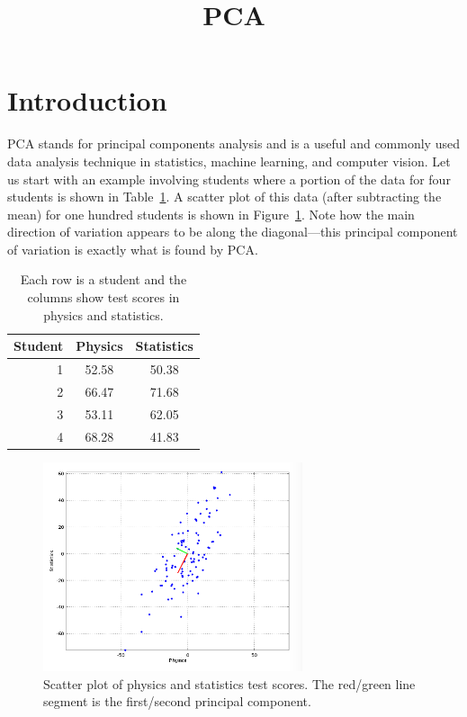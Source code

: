 \documentclass{article}
\begin{document}
\title{PCA}
\author{}
\date{}
\maketitle

\section{Introduction}

PCA stands for principal components analysis and is a useful and commonly used data analysis technique in statistics, machine learning, and computer vision.  Let us start with an example involving students where a portion of the data for four students is shown in Table~\ref{tab:students}.  A scatter plot of this data (after subtracting the mean) for one hundred students is shown in Figure~\ref{fig:students}.  Note how the main direction of variation appears to be along the diagonal---this principal component of variation is exactly what is found by PCA.

\begin{table}
\centering
\begin{tabular}{rcc}
Student & Physics & Statistics \\
\hline
1 & 52.58 & 50.38 \\
2 & 66.47 & 71.68 \\
3 & 53.11 & 62.05 \\
4 & 68.28 & 41.83 \\
\end{tabular}
\caption{Each row is a student and the columns show test scores in physics and statistics.}
\label{tab:students}
\end{table}

\begin{figure}
\centering
\includegraphics[width=3in]{physicsStatistics.png}
\caption{Scatter plot of physics and statistics test scores.  The red/green line segment is the first/second principal component.}
\label{fig:students}
\end{figure}
\end{document}
